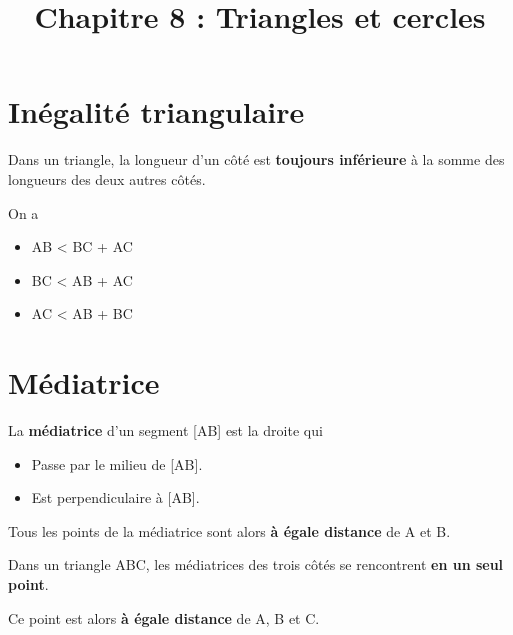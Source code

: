 \documentclass[a4paper,11pt]{article}
\title{Chapitre 8 : Triangles et cercles}
\date{}
\author{}
\begin{document}
\maketitle

\section{Inégalité triangulaire}

\begin{cours}
	Dans un triangle, la longueur d'un côté est \textbf{toujours inférieure} à la somme des longueurs des deux autres côtés.
\end{cours}

\begin{exemple}

	On a
	\begin{itemize}
		\item AB < BC + AC
		\item BC < AB + AC
		\item AC < AB + BC
	\end{itemize}
\end{exemple}

\section{Médiatrice}

\begin{cours}[Médiatrice]
	La \textbf{médiatrice} d'un segment [AB] est la droite qui
	\begin{itemize}
		\item Passe par le milieu de [AB].
		\item Est perpendiculaire à [AB].
	\end{itemize}

	Tous les points de la médiatrice sont alors \textbf{à égale distance} de A et B.
\end{cours}

\begin{cours}
	Dans un triangle ABC, les médiatrices des trois côtés se rencontrent \textbf{en un seul point}.

	Ce point est alors \textbf{à égale distance} de A, B et C.
\end{cours}
\end{document}

